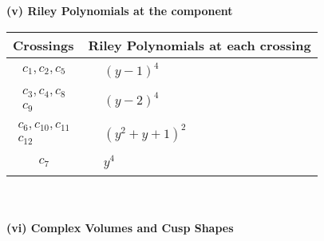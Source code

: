 \documentclass[1p]{elsarticle_modified}
\theoremstyle{definition}
\begin{document}
\newpage\renewcommand{\arraystretch}{1}
\flushleft \textbf{(v) Riley Polynomials at the component}\newline \\
\begin{tabular}{m{50pt}|m{274pt}}
Crossings & \hspace{64pt}Riley Polynomials at each crossing \\
\hline $$\begin{aligned}c_{1},c_{2},c_{5}\end{aligned}$$&$\begin{aligned}
&(y-1)^4
\end{aligned}$\\
\hline $$\begin{aligned}c_{3},c_{4},c_{8}\\c_{9}\end{aligned}$$&$\begin{aligned}
&(y-2)^4
\end{aligned}$\\
\hline $$\begin{aligned}c_{6},c_{10},c_{11}\\c_{12}\end{aligned}$$&$\begin{aligned}
&(y^2+y+1)^2
\end{aligned}$\\
\hline $$\begin{aligned}c_{7}\end{aligned}$$&$\begin{aligned}
&y^4
\end{aligned}$\\
\hline
\end{tabular}\\~\\
\newpage\flushleft \textbf{(vi) Complex Volumes and Cusp Shapes}
\end{document}
